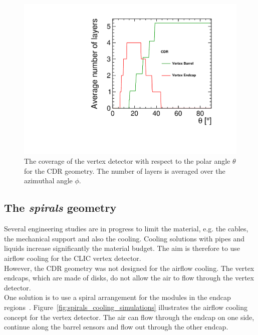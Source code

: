 \begin{figure}[H]
  \centering
  \includegraphics[scale=0.4]{Figures/Geometries/nb_layer_cdr.pdf}
  \caption{The coverage of the vertex detector with respect to the polar angle $\theta$ for the CDR geometry. The number of layers is averaged over the azimuthal angle $\phi$.}
  \label{fig:default_nb_barrel_endcap}
\end{figure}

\subsection{The \emph{spirals} geometry}\label{sec:CLIC_SiD_spirals}

Several engineering studies are in progress to limit the material, e.g. the cables, the mechanical support and also the cooling. Cooling solutions with pipes and liquids increase significantly the material budget. The aim is therefore to use airflow cooling for the CLIC vertex detector. \\
However, the CDR geometry was not designed for the airflow cooling. The vertex endcaps, which are made of disks, do not allow the air to flow through the vertex detector. \\
One solution is to use a spiral arrangement for the modules in the endcap regions~\cite{CoolingSimulations}. Figure~\ref{fig:spirals_cooling_simulations} illustrates the airflow cooling concept for the vertex detector. The air can flow through the endcap on one side, continue along the barrel sensors and flow out through the other endcap.

